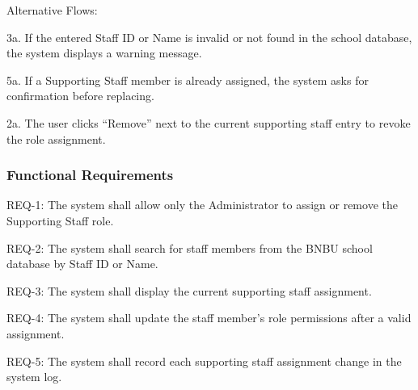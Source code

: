Alternative Flows:

3a. If the entered Staff ID or Name is invalid or not found in the school database, the system displays a warning message.

5a. If a Supporting Staff member is already assigned, the system asks for confirmation before replacing.

2a. The user clicks ``Remove'' next to the current supporting staff entry to revoke the role assignment.

\subsubsection{Functional Requirements}

REQ-1: The system shall allow only the Administrator to assign or remove the Supporting Staff role.

REQ-2: The system shall search for staff members from the BNBU school database by Staff ID or Name.

REQ-3: The system shall display the current supporting staff assignment.

REQ-4: The system shall update the staff member's role permissions after a valid assignment.

REQ-5: The system shall record each supporting staff assignment change in the system log.
